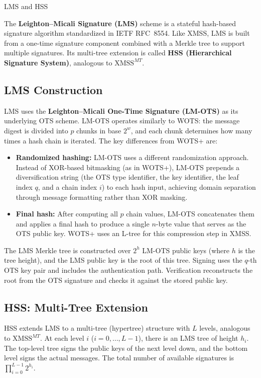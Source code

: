 \documentclass[version=preprint]{iacrcc}
\begin{document}
\begin{section}{LMS and HSS}

The \textbf{Leighton--Micali Signature (LMS)} scheme \cite{mcgrew2019leighton} is a stateful hash-based signature algorithm standardized in IETF RFC~8554. Like XMSS, LMS is built from a one-time signature component combined with a Merkle tree to support multiple signatures. Its multi-tree extension is called \textbf{HSS (Hierarchical Signature System)}, analogous to $\text{XMSS}^{MT}$.

\subsection{LMS Construction}

LMS uses the \textbf{Leighton--Micali One-Time Signature (LM-OTS)} as its underlying OTS scheme. LM-OTS operates similarly to WOTS: the message digest is divided into $p$ chunks in base $2^w$, and each chunk determines how many times a hash chain is iterated. The key differences from WOTS+ are:

\begin{itemize}
    \item \textbf{Randomized hashing:} LM-OTS uses a different randomization approach. Instead of XOR-based bitmasking (as in WOTS+), LM-OTS prepends a diversification string (the OTS type identifier, the key identifier, the leaf index $q$, and a chain index $i$) to each hash input, achieving domain separation through message formatting rather than XOR masking.
    \item \textbf{Final hash:} After computing all $p$ chain values, LM-OTS concatenates them and applies a final hash to produce a single $n$-byte value that serves as the OTS public key. WOTS+ uses an L-tree for this compression step in XMSS.
\end{itemize}

The LMS Merkle tree is constructed over $2^h$ LM-OTS public keys (where $h$ is the tree height), and the LMS public key is the root of this tree. Signing uses the $q$-th OTS key pair and includes the authentication path. Verification reconstructs the root from the OTS signature and checks it against the stored public key.

\subsection{HSS: Multi-Tree Extension}

HSS extends LMS to a multi-tree (hypertree) structure with $L$ levels, analogous to $\text{XMSS}^{MT}$. At each level $i$ ($i = 0, \ldots, L-1$), there is an LMS tree of height $h_i$. The top-level tree signs the public keys of the next level down, and the bottom level signs the actual messages. The total number of available signatures is $\prod_{i=0}^{L-1} 2^{h_i}$.


\end{section}
\end{document}
